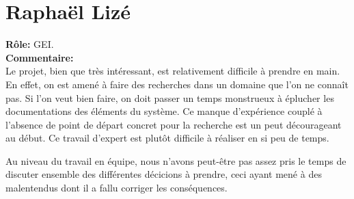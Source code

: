 \documentclass [a4paper] {report}
\begin{document}
\section*{Raphaël Lizé}

\textbf{Rôle:} GEI.\\

\textbf{Commentaire:}\\
Le projet, bien que très intéressant, est relativement difficile
à prendre en main. En effet, on est amené à faire des recherches
dans un domaine que l'on ne connaît pas. Si l'on veut bien faire,
on doit passer un temps monstrueux à éplucher les documentations
des éléments du système. Ce manque d'expérience couplé à l'absence
de point de départ concret pour la recherche est un peut décourageant
au début. Ce travail d'expert est plutôt difficile à réaliser en
si peu de temps.

Au niveau du travail en équipe, nous n'avons peut-être pas assez
pris le temps de discuter ensemble des différentes décicions à
prendre, ceci ayant mené à des malentendus dont il a fallu corriger
les conséquences.
\end{document}
